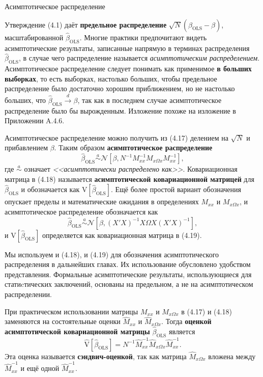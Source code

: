 \begin{center}
 Асимптотическое распределение
 \end{center} 
Утверждение (4.1) даёт \textbf{предельное распределение} $\sqrt{N}(\hat{\beta}_{\text{OLS}}-\beta)$, масштабированной $\hat{\beta}_{\text{OLS}}$. Многие практики предпочитают видеть асимптотические результаты, записанные напрямую в терминах распределения $\hat{\beta}_{\text{OLS}}$, в случае чего распределение называется \textit{асимптотическим распределением}. Асимптотическое распределение следует понимать как применимое \textbf{в больших выборках}, то есть выборках, настолько больших, чтобы предельное распределение было достаточно хорошим приближением, но не настолько больших, что $\hat{\beta}_{\text{OLS}} \xrightarrow{d}\beta$, так как в последнем случае асимптотическое распределение было бы вырожденным. Изложение похоже на изложение в Приложении A.4.6.

Асимптотическое распределение можно получить из (4.17) делением на $\sqrt{N}$ и прибавлением $\beta$. Таким образом \textbf{асимптотическое распределение} 
\begin{equation}
\hat{\beta}_{\text{OLS}} \stackrel{a}{\sim} \mathcal{N} [\beta,N^{-1} M_{xx}^{-1}M_{x \Omega x} M_{xx}^{-1}], 
\end{equation}
где $\stackrel{a}{\sim}$ означает \textit{<<асимптотически распределено как>>}. Ковариационная матрица в (4.18) называется \textbf{асимптотической ковариационной матрицей} для $\hat{\beta}_{\text{OLS}}$ и обозначается как $\mathrm{V}[\hat{\beta}_{\text{OLS}}]$. Ещё более простой вариант обозначения опускает пределы и математические ожидания в определениях $M_{xx}$ и $M_{x \Omega x}$, и асимптотическое распределение обозначается как
\begin{equation}
\hat{\beta}_{\text{OLS}} \stackrel{a}{\sim} \mathcal{N} [\beta, (X'X)^{-1} X\Omega X (X'X)^{-1}],
\end{equation}
и $\mathrm{V}[\hat{\beta}_{\text{OLS}}]$ определяется как ковариационная матрица в (4.19).

Мы используем и (4.18), и (4.19) для обозначения асимптотического распределения в дальнейших главах. Их использование обусловлено удобством представления. Формальные асимптотические результаты, использующиеся для статиcтических заключений, основаны на предельном, а не на асимптотическом распределении.

При практическом использовании матрицы $M_{xx}$ и $M_{x \Omega x}$ в (4.17) и (4.18) заменяются на состоятельные оценки $\hat{M}_{xx}$ и $\hat{M}_{x \Omega x}$. Тогда \textbf{оценкой асимптотической ковариационной матрицы}  $\hat{\beta}_{\text{OLS}}$ является
\begin{equation}
\mathrm{\hat{V}}[\hat{\beta}_{\text{OLS}}] = N^{-1} \hat{M}_{xx}^{-1} \hat{M}_{x \Omega x} \hat{M}_{xx}^{-1}.
\end{equation}
Эта оценка называется \textbf{сэндвич-оценкой}, так как матрица $ \hat{M}_{x \Omega x}$ вложена между $\hat{M}_{xx}^{-1}$ и ещё одной $\hat{M}_{xx}^{-1}$.


